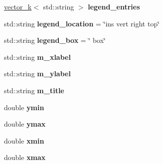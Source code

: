 \begin{DoxyCompactItemize}
\item 
\hypertarget{classkeycpp_1_1_plots_ac1ead832f730af660bdb00e19da307e0}{\hyperlink{classkeycpp_1_1vector__k}{vector\-\_\-k}$<$ std\-::string $>$ {\bfseries legend\-\_\-entries}}\label{classkeycpp_1_1_plots_ac1ead832f730af660bdb00e19da307e0}

\item 
\hypertarget{classkeycpp_1_1_plots_add620558a2e9a243a95ffdfe7489897b}{std\-::string {\bfseries legend\-\_\-location} = \char`\"{}ins vert right top\char`\"{}}\label{classkeycpp_1_1_plots_add620558a2e9a243a95ffdfe7489897b}

\item 
\hypertarget{classkeycpp_1_1_plots_ab3c932242df0fa03798ecfd2dba3ebaa}{std\-::string {\bfseries legend\-\_\-box} = \char`\"{} box\char`\"{}}\label{classkeycpp_1_1_plots_ab3c932242df0fa03798ecfd2dba3ebaa}

\item 
\hypertarget{classkeycpp_1_1_plots_a18a69c533594b4bc1c88fdb29267db1e}{std\-::string {\bfseries m\-\_\-xlabel}}\label{classkeycpp_1_1_plots_a18a69c533594b4bc1c88fdb29267db1e}

\item 
\hypertarget{classkeycpp_1_1_plots_ad2987af367059a0659e013708342451b}{std\-::string {\bfseries m\-\_\-ylabel}}\label{classkeycpp_1_1_plots_ad2987af367059a0659e013708342451b}

\item 
\hypertarget{classkeycpp_1_1_plots_a849d297c44ebca4f7c856c99cfcc2b5f}{std\-::string {\bfseries m\-\_\-title}}\label{classkeycpp_1_1_plots_a849d297c44ebca4f7c856c99cfcc2b5f}

\item 
\hypertarget{classkeycpp_1_1_plots_a54578198c41d34705e9fbe94a88ec6ae}{double {\bfseries ymin}}\label{classkeycpp_1_1_plots_a54578198c41d34705e9fbe94a88ec6ae}

\item 
\hypertarget{classkeycpp_1_1_plots_ad411158572c6ee36b1f4abc9c9dfec77}{double {\bfseries ymax}}\label{classkeycpp_1_1_plots_ad411158572c6ee36b1f4abc9c9dfec77}

\item 
\hypertarget{classkeycpp_1_1_plots_a1d027ed119d5b4a8d7d9ccc72f9a0eb1}{double {\bfseries xmin}}\label{classkeycpp_1_1_plots_a1d027ed119d5b4a8d7d9ccc72f9a0eb1}

\item 
\hypertarget{classkeycpp_1_1_plots_a4d7f34173d13de92014702ffba6fb1d4}{double {\bfseries xmax}}\label{classkeycpp_1_1_plots_a4d7f34173d13de92014702ffba6fb1d4}


\end{DoxyCompactItemize}
